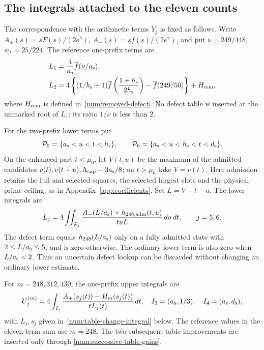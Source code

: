 \subsection{The integrals attached to the eleven counts}
\label{num:eleven-integrals}
The correspondence with the arithmetic terms $Y_j$ is fixed as follows.
Write $A_+(s)=sF(s)/(2e^\gamma)$,
$A_-(s)=sf(s)/(2e^\gamma)$, and put
$\nu=249/448$, $w_*=25/224$. The reference one-prefix terms are
\begin{align*}
 L_1&=\frac4{a_{\rm s}}\overline f(\nu/{a_{\rm s}}),\\
 L_2&=4\left\{(1/{h_{\rm s}}+1)\overline f\left(\frac{1+{h_{\rm s}}}{2{h_{\rm s}}}\right)
                 -\overline f(249/50)\right\}+H_{\rm rem},
\end{align*}
where $H_{\rm rem}$ is defined in~\eqref{num:removed-defect}.
No defect table is inserted at the unmarked root of $L_1$:
its ratio $1/\nu$ is less than $2$.

For the two-prefix lower terms put
\[
 \mathcal P_5=\{{a_{\rm s}}<u<t<{h_{\rm s}}\},\qquad
 \mathcal P_6=\{{a_{\rm s}}<u<{h_{\rm s}}<t<{d_{\rm s}}\}.
\]
On the enhanced part $t<\mu_0$, let
$V(t,u)$ be the maximum of the admitted candidates
$v(t),v(t+u),\Lambda_{\rm cap}-3{a_{\rm s}}/8$; on $t>\mu_0$ take $V=v(t)$.
Here admission retains the full and selected squares, the selected
largest slots and the physical prime ceiling, as in
Appendix~\ref{app:coefficients}. Set $L=V-t-u$. The lower integrals are
\begin{equation}
 L_j=4\iint_{\mathcal P_j}
        \frac{A_-(L/{a_{\rm s}})+h_{248,\rm adm}(t,u)}{tuL}\,du\,dt,
 \qquad j=5,6.
 \label{num:pair-lower-integrals}
\end{equation}
The defect term equals $h_{248}(L/{a_{\rm s}})$ only on a fully admitted state
with $2\le L/{a_{\rm s}}\le5$, and is zero otherwise. The ordinary lower term
is also zero when $L/{a_{\rm s}}<2$. Thus an uncertain defect lookup can be
discarded without changing an ordinary lower estimate.

For $m=248,312,430$, the one-prefix upper integrals are
\begin{equation}
 U_j^{(m)}=4\int_{I_j}
       \frac{A_+(s_j(t))-H_m(s_j(t))}{tL_j(t)}\,dt,
 \quad I_3=({a_{\rm s}},1/3),\quad I_4=({a_{\rm s}},{d_{\rm s}}),
 \label{num:one-prefix-upper-integrals}
\end{equation}
with $L_j,s_j$ given in~\eqref{num:table-change-integral} below.
The reference values in the eleven-term sum use $m=248$.
The two subsequent table improvements are inserted only through
\eqref{num:successive-table-gains}.

